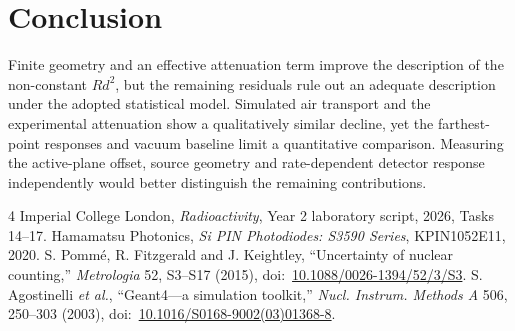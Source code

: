 \documentclass[journal,a4paper]{IEEEtran}
\begin{document}
\section{Conclusion}\label{sec:conclusion}
Finite geometry and an effective attenuation term improve the description of the non-constant $Rd^2$, but the remaining residuals rule out an adequate description under the adopted statistical model. Simulated air transport and the experimental attenuation show a qualitatively similar decline, yet the farthest-point responses and vacuum baseline limit a quantitative comparison. Measuring the active-plane offset, source geometry and rate-dependent detector response independently would better distinguish the remaining contributions.

\clearpage
{}\label{sec:references}
\begin{thebibliography}{4}
 Imperial College London, \emph{Radioactivity}, Year 2 laboratory script, 2026, Tasks 14--17.
 Hamamatsu Photonics, \emph{Si PIN Photodiodes: S3590 Series}, KPIN1052E11, 2020.
 S. Pomm\'e, R. Fitzgerald and J. Keightley, ``Uncertainty of nuclear counting,'' \emph{Metrologia} 52, S3--S17 (2015), doi:~\href{https://doi.org/10.1088/0026-1394/52/3/S3}{10.1088/0026-1394/52/3/S3}.
 S. Agostinelli \emph{et al.}, ``Geant4---a simulation toolkit,'' \emph{Nucl. Instrum. Methods A} 506, 250--303 (2003), doi:~\href{https://doi.org/10.1016/S0168-9002(03)01368-8}{10.1016/S0168-9002(03)01368-8}.
\end{thebibliography}
\end{document}
